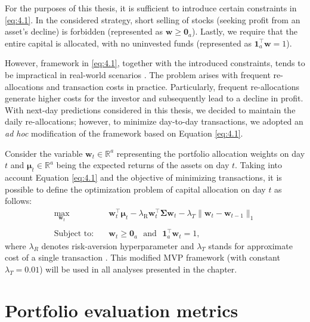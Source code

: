 For the purposes of this thesis, it is sufficient to introduce certain constraints in \eqref{eq:4.1}. In the considered strategy, short selling of stocks (seeking profit from an asset's decline) is forbidden
(represented as $\mathbf{w} \geq \mathbf{0}_a$). Lastly, we require that the entire capital is allocated, with no uninvested funds (represented as $\mathbf{1}_a^{\top}\mathbf{w}=1$).

However, framework in \eqref{eq:4.1}, together with the introduced constraints, tends to be impractical in real-world scenarios \cite{portfolio}. The problem arises with frequent re-allocations
and transaction costs in practice. Particularly, frequent re-allocations generate higher costs for the investor and subsequently lead to a decline in profit. With next-day predictions
considered in this thesis, we decided to maintain the daily re-allocations; however, to minimize day-to-day transactions, we adopted an \textit{ad hoc} modification of the framework based on Equation \eqref{eq:4.1}.

Consider the variable $\mathbf{w}_t \in \mathbb{R}^a$ representing the portfolio allocation weights on day $t$ and $\bm{\mu}_t \in \mathbb{R}^a$ being the expected returns 
of the assets on day $t$. Taking into account Equation \eqref{eq:4.1} and the objective of minimizing transactions, it is possible to define the optimization problem of capital allocation on day $t$ as follows:
\begin{equation}
\begin{aligned}
\max_{\mathbf{w}_t} \quad 
& \mathbf{w}_t^{\top}\bm{\mu}_t 
- \lambda_{\text{R}} \mathbf{w}_t^{\top}\bm{\Sigma}\mathbf{w}_t 
- \lambda_{T} \|\mathbf{w}_t - \mathbf{w}_{t-1}\|_1 \\
\\
\text{Subject to:} \quad 
& \mathbf{w}_t \geq \mathbf{0}_a \>\>\> \text{and} \>\>\> \mathbf{1}_a^{\top}\mathbf{w}_t=1,
\label{eq:4.2}
\end{aligned}
\end{equation}
where $\lambda_R$ denotes risk-aversion hyperparameter and $\lambda_T$ stands for approximate cost of a single transaction \cite{portfolio}. This modified MVP framework (with constant $\lambda_T = 0.01$) will be used in all analyses presented in the chapter.

\section{Portfolio evaluation metrics}


